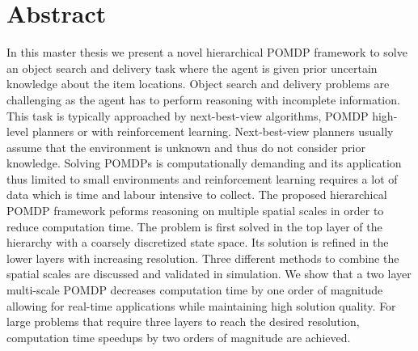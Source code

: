 \chapter*{Abstract}




In this master thesis we present a novel hierarchical POMDP framework to solve an object search and delivery task where the agent is given prior uncertain knowledge about the item locations. Object search and delivery problems are challenging as the agent has to perform reasoning with incomplete information.
This task is typically approached by next-best-view algorithms, POMDP high-level planners or with reinforcement learning. Next-best-view planners usually assume that the environment is unknown and thus do not consider prior knowledge. Solving POMDPs is computationally demanding and its application thus limited to small environments and reinforcement learning requires a lot of data which is time and labour intensive to collect. The proposed hierarchical POMDP framework peforms reasoning on multiple spatial scales in order to reduce computation time. 
The problem is first solved in the top layer of the hierarchy with a coarsely discretized state space. Its solution is refined in the lower layers with increasing resolution. Three different methods to combine the spatial scales are discussed and validated in simulation. We show that a two layer multi-scale POMDP decreases computation time by one order of magnitude allowing for real-time applications while maintaining high solution quality. For large problems that require three layers to reach the desired resolution, computation time speedups by two orders of magnitude are achieved.
